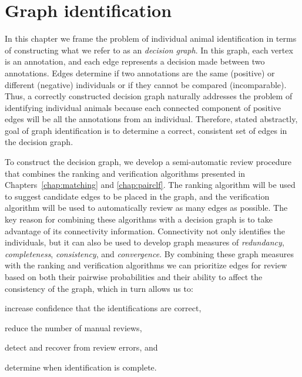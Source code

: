 \chapter{Graph identification}\label{chap:graphid}
\newcommand{\nT}{N}

In this chapter we frame the problem of individual animal identification in
  terms of constructing what we refer to as an \emph{decision graph}.
In this graph, each vertex is an annotation, and each edge represents a
  decision made between two annotations.
Edges determine if two annotations are the same (positive) or different
  (negative) individuals or if they cannot be compared (incomparable).
Thus, a correctly constructed decision graph naturally addresses the problem
  of identifying individual animals because each connected component of positive
  edges will be all the annotations from an individual.
Therefore, stated abstractly, goal of graph identification is to determine a
  correct, consistent set of edges in the decision graph.

To construct the decision graph, we develop a semi-automatic review procedure
  that combines the ranking and verification algorithms presented in
  Chapters~\ref{chap:matching} and \ref{chap:pairclf}.
The ranking algorithm will be used to suggest candidate edges to be placed in
  the graph, and the verification algorithm will be used to automatically review
  as many edges as possible.
The key reason for combining these algorithms with a decision graph is to take
  advantage of its connectivity information.
Connectivity not only identifies the individuals, but it can also be used to
  develop graph measures of \emph{redundancy}, \emph{completeness},
  \emph{consistency}, and \emph{convergence}.
By combining these graph measures with the ranking and verification algorithms
  we can prioritize edges for review based on both their pairwise probabilities
  and their ability to affect the consistency of the graph, which in turn allows
  us to:
  \begin{enumin}
    \item increase confidence that the identifications are correct, %
    \item reduce the number of manual reviews,  %
    \item detect and recover from review errors, and %
    \item determine when identification is complete. %
  \end{enumin}

